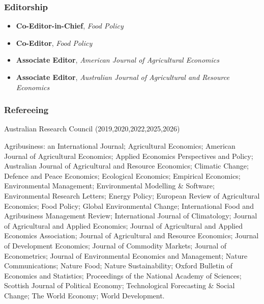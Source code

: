 \documentclass[10pt]{article}
\begin{document}
	\subsubsection*{Editorship}
	\begin{itemize}
		\item {} \textbf{Co-Editor-in-Chief}, \textsl{Food Policy}
		\item {} \textbf{Co-Editor}, \textsl{Food Policy}
		\item {} \textbf{Associate Editor}, \textsl{American Journal of Agricultural Economics}
		\item {} \textbf{Associate Editor}, \textsl{Australian Journal of Agricultural and Resource Economics}
	\end{itemize}
	
	\bigskip
	\subsubsection*{Refereeing}
	Australian Research Council (2019,2020,2022,2025,2026)
	
	\medskip
	Agribusiness: an International Journal; Agricultural Economics; American Journal of Agricultural Economics; Applied Economics Perspectives and Policy; Australian Journal of Agricultural and Resource Economics; Climatic Change; Defence and Peace Economics; Ecological Economics; Empirical Economics; Environmental Management; Environmental Modelling \& Software; Environmental Research Letters; Energy Policy; European Review of Agricultural Economics; Food Policy; Global Environmental Change; International Food and Agribusiness Management Review; International Journal of Climatology; Journal of Agricultural and Applied Economics; Journal of Agricultural and Applied Economics Association; Journal of Agricultural and Resource Economics; Journal of Development Economics; Journal of Commodity Markets; Journal of Econometrics; Journal of Environmental Economics and Management; Nature Communications; Nature Food; Nature Sustainability; Oxford Bulletin of Economics and Statistics; Proceedings of the National Academy of Sciences; Scottish Journal of Political Economy; Technological Forecasting \& Social Change; The World Economy; World Development.
	
	\bigskip
\end{document}

